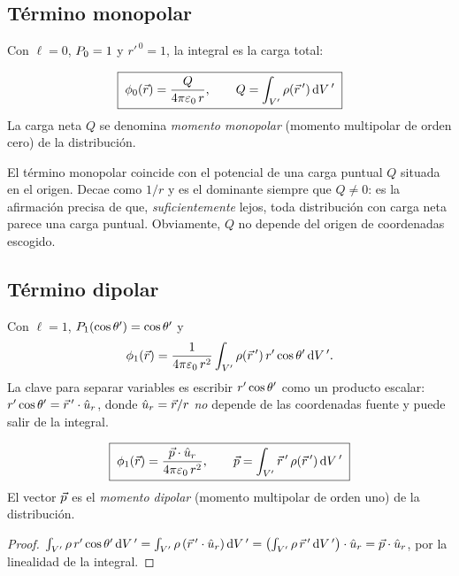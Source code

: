\subsection{Término monopolar}\label{sec:monopolar}
Con $\ell=0$, $P_{0}=1$ y $r'^{\,0}=1$, la integral es la carga total:

\begin{proposicion}\label{prop:monopolar}
\begin{equation}\label{eq:monopolar}
  \boxed{\;\phi_{0}(\vec{r})=\frac{Q}{4\pi\varepsilon_{0}\,r},\qquad Q=\int_{V'}\rho(\vec{r}\,')\,\mathrm{d} V\,'\;}
\end{equation}
La carga neta $Q$ se denomina \emph{momento monopolar} (momento multipolar de orden cero) de la distribución.
\end{proposicion}

\begin{observacion}\label{obs:monopolar}
El término monopolar coincide con el potencial de una carga puntual $Q$ situada en el origen. Decae como $1/r$ y es el dominante siempre que $Q\neq0$: es la
afirmación precisa de que, \emph{suficientemente} lejos, toda distribución con carga neta parece una carga puntual. Obviamente, $Q$ no depende del origen de
coordenadas escogido.
\end{observacion}

\subsection{Término dipolar}\label{sec:dipolar}
Con $\ell=1$, $P_{1}(\cos\theta')=\cos\theta'$ y
\[
  \phi_{1}(\vec{r})=\frac{1}{4\pi\varepsilon_{0}\,r^{2}}\int_{V'}\rho(\vec{r}\,')\,r'\cos\theta'\,\mathrm{d} V\,' .
\]
La clave para separar variables es escribir $r'\cos\theta'$ como un producto escalar: $r'\cos\theta'=\vec{r}\,'\cdot\hat{u}_{r}$, donde $\hat{u}_{r}=\vec{r}/r$ \emph{no} depende de las coordenadas fuente
y puede salir de la integral.

\begin{proposicion}\label{prop:dipolar}
\begin{equation}\label{eq:dipolar}
  \boxed{\;\phi_{1}(\vec{r})=\frac{\vec{p}\cdot\hat{u}_{r}}{4\pi\varepsilon_{0}\,r^{2}},\qquad \vec{p}=\int_{V'}\vec{r}\,'\,\rho(\vec{r}\,')\,\mathrm{d} V\,'\;}
\end{equation}
El vector $\vec{p}$ es el \emph{momento dipolar} (momento multipolar de orden uno) de la distribución.
\end{proposicion}
\begin{proof}
$\int_{V'}\rho\,r'\cos\theta'\,\mathrm{d} V\,'=\int_{V'}\rho\,(\vec{r}\,'\cdot\hat{u}_{r})\,\mathrm{d} V\,'=\bigl(\int_{V'}\rho\,\vec{r}\,'\,\mathrm{d} V\,'\bigr)\cdot\hat{u}_{r}=\vec{p}\cdot\hat{u}_{r}$, por la linealidad de la integral.
\end{proof}

